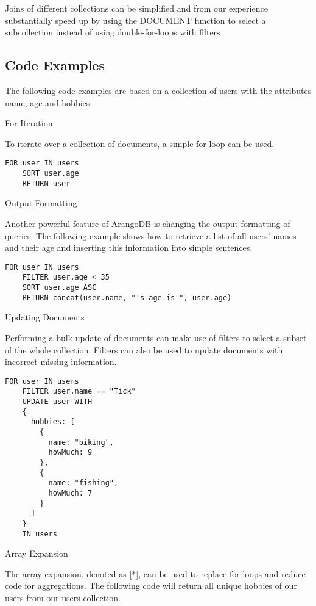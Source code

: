 Joins of different collections can be simplified and from our experience substantially speed up by using the DOCUMENT function to select a subcollection instead of using double-for-loops with filters

\subsection{Code Examples}
The following code examples are based on a collection of users with the attributes name, age and hobbies.

For-Iteration

To iterate over a collection of documents, a simple for loop can be used.

\begin{lstlisting}[language=ArangoQL,label={lst:graph},caption={For-Loop}]
  FOR user IN users
    SORT user.age
    RETURN user
\end{lstlisting}

Output Formatting

Another powerful feature of ArangoDB is changing the output formatting of queries. The following example shows how to retrieve a list of all users' names and their age and inserting this information into simple sentences.

\begin{lstlisting}[language=ArangoQL,label={lst:graph},caption={Output formatting}]
  FOR user IN users
    FILTER user.age < 35
    SORT user.age ASC
    RETURN concat(user.name, "'s age is ", user.age)
\end{lstlisting}

Updating Documents

Performing a bulk update of documents can make use of filters to select a subset of the whole collection. Filters can also be used to update documents with incorrect missing information.

\begin{lstlisting}[language=ArangoQL,label={lst:graph},caption={Updating documents}]
  FOR user IN users
    FILTER user.name == "Tick"
    UPDATE user WITH
    {
      hobbies: [
        {
          name: "biking",
          howMuch: 9
        },
        {
          name: "fishing",
          howMuch: 7
        }
      ]
    }
    IN users
\end{lstlisting}

Array Expansion

The array expansion, denoted as [*], can be used to replace for loops and reduce code for aggregations. The following code will return all unique hobbies of our users from our users collection.

